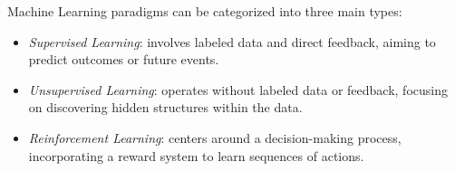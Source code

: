 Machine Learning paradigms can be categorized into three main types:
\begin{itemize}
    \item \textit{Supervised Learning}: involves labeled data and direct feedback, aiming to predict outcomes or future events.
    \item \textit{Unsupervised Learning}: operates without labeled data or feedback, focusing on discovering hidden structures within the data.
    \item \textit{Reinforcement Learning}: centers around a decision-making process, incorporating a reward system to learn sequences of actions.
\end{itemize}